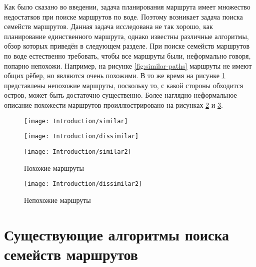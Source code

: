 Как было сказано во введении, задача планирования маршрута имеет
множество недостатков при поиске маршрутов по воде. Поэтому возникает
задача поиска семейств маршрутов. Данная задача исследована не так
хорошо, как планирование единственного маршрута, однако известны
различные алгоритмы, обзор которых приведён в следующем разделе. При
поиске семейств маршрутов по воде естественно требовать, чтобы все
маршруты были, неформально говоря, попарно непохожи. Например, на
рисунке \ref{fig:similar-paths} маршруты не имеют общих рёбер, но являются
очень похожими. В то же время на рисунке \ref{fig:dissimilar-paths}
представлены непохожие маршруты, поскольку то, с какой стороны
обходится остров, может быть достаточно существенно. Более наглядно
неформальное описание похожести маршрутов проиллюстрировано на рисунках
\ref{fig:similar-paths2} и \ref {fig:dissimilar-paths2}.

\begin{figure}
    \centering
    \begin{minipage}{.5\textwidth}
        \centering
        \texttt{[image: Introduction/similar]}
        \label{fig:similar-paths}
    \end{minipage}%
    \begin{minipage}{.5\textwidth}
        \centering
        \texttt{[image: Introduction/dissimilar]}
        \label{fig:dissimilar-paths}
    \end{minipage}
\end{figure}

\begin{figure}
    \texttt{[image: Introduction/similar2]}
    \caption{Похожие маршруты}
    \label{fig:similar-paths2}
\end{figure}

\begin{figure}
    \texttt{[image: Introduction/dissimilar2]}
    \caption{Непохожие маршруты}
    \label{fig:dissimilar-paths2}
\end{figure}

\FloatBarrier

\section{Существующие алгоритмы поиска семейств маршрутов}

